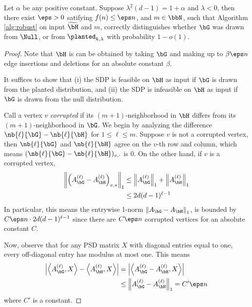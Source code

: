 \begin{theorem}
    Let $\alpha$ be any positive constant.  Suppose $\lambda^2(d-1) = 1+\alpha$ and $\lambda < 0$, then there exist $\eps > 0$ satifying $f(n)\le\eps n$, and $m \in \bbN$, such that Algorithm \ref{alg:robust} on input $\widetilde{\bH}$ and $m$, correctly distinguishes whether $\bG$ was drawn from $\Null$, or from $\planted_{k,\lambda}$ with probability $1-o(1)$.
\end{theorem}
\begin{proof}
	Note that $\bH$ is can be obtained by taking $\bG$ and making up to $\beta\eps n$ edge insertions and deletions for an absolute constant $\beta$.

	It suffices to show that (i) the SDP is feasible on $\bH$ as input if $\bG$ is drawn from the planted distribution, and (ii) the SDP is infeasible on $\bH$ as input if $\bG$ is drawn from the null distribution.

	Call a vertex $v$ \emph{corrupted} if its $(m+1)$-neighborhood in $\bH$ differs from its $(m+1)$-neighborhood in $\bG$.  We begin by analyzing the difference $\nb{\ell}{\bG} -\nb{\ell}{\bH}$ for $1\le\ell\le m$. Suppose $v$ is not a corrupted vertex, then $\nb{\ell}{\bG}$ and $\nb{\ell}{\bH}$ agree on the $v$-th row and column, which means $(\nb{\ell}{\bG}-\nb{\ell}{\bH})_{v,\cdot}$ is 0.  On the other hand, if $v$ is a corrupted vertex,
	\begin{align*}
		\left\|\left(A_{\bG}^{(\ell)}-A_{\bH}^{(\ell)}\right)_{v,*}\right\|_1 &\le \left\|A_{\bG}^{(\ell)}\right\|_1 + \left\|A_{\bH}^{(\ell)}\right\|_1\\
		&\le 2d(d-1)^{\ell-1}
	\end{align*}
	In particular, this means the entrywise 1-norm  $\left\|A_{\bG}-A_{\bH}\right\|_1$, is bounded by $C\eps n\cdot 2d(d-1)^{\ell-1}$ since there are $C\eps n$ corrupted vertices for an absolute constant $C$.

	Now, observe that for any PSD matrix $X$ with diagonal entries equal to one, every off-diagonal entry has modulus at most one.  This means
	\begin{align*}
		\left|\left\langle A_{\bG}^{(\ell)}, X \right\rangle - \left\langle A_{\bH}^{(\ell)}, X \right\rangle \right| &= \left| \left\langle A_{\bG}^{(\ell)}-A_{\bH}^{(\ell)}, X \right\rangle \right|\\
		&\le \left\| A_{\bG}^{(\ell)} - A_{\bH}^{(\ell)} \right\|_1 = C'\eps n
	\end{align*}
    where $C'$ is a constant.


\end{proof}
